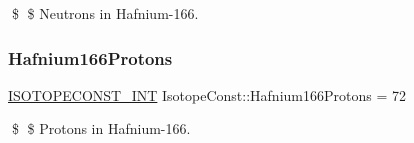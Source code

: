 \$ \$ Neutrons in Hafnium-\/166. \mbox{\label{group___isotope_const-_hafnium-_hf166_ga22bed5fe359f0a957d3456138bd82ad4}} 
\subsubsection{\texorpdfstring{Hafnium166\+Protons}{Hafnium166Protons}}
{\footnotesize\ttfamily \mbox{\hyperlink{group___isotope_const-_macros_ga5f18360b3e99483a35c32d789e62621c}{I\+S\+O\+T\+O\+P\+E\+C\+O\+N\+S\+T\+\_\+\+I\+NT}} Isotope\+Const\+::\+Hafnium166\+Protons = 72}

\$ \$ Protons in Hafnium-\/166. 